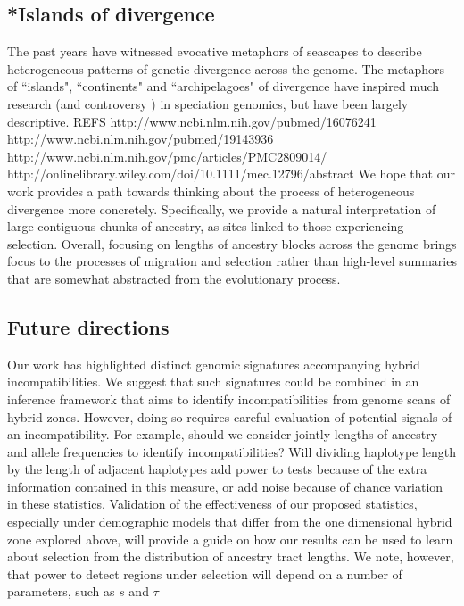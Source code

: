 \documentclass[11pt,letterpaper]{article}
\begin{document}
\subsection{*Islands of divergence}  
The past years have witnessed evocative metaphors of seascapes to describe heterogeneous patterns of genetic divergence across the genome.  
The metaphors of ``islands", ``continents" and ``archipelagoes" of divergence \citep{Turner2005, Nosil2009} have inspired much research (and controversy  \citep{Noor2009,Cruickshank2014}) in speciation genomics, but have been largely descriptive.  
REFS  http://www.ncbi.nlm.nih.gov/pubmed/16076241 http://www.ncbi.nlm.nih.gov/pubmed/19143936 http://www.ncbi.nlm.nih.gov/pmc/articles/PMC2809014/ http://onlinelibrary.wiley.com/doi/10.1111/mec.12796/abstract
We hope that our work provides a path towards thinking about the process of heterogeneous divergence more concretely. %
Specifically, we provide a natural interpretation of large contiguous chunks of ancestry, as sites linked to those experiencing selection.   
Overall, focusing on lengths of ancestry blocks across the genome brings focus to the processes of migration and selection rather than high-level summaries that are somewhat abstracted from the evolutionary process. 


\subsection*{Future directions}
Our work has highlighted distinct genomic signatures accompanying hybrid incompatibilities. 
We suggest that such signatures could be combined in an inference framework that aims to identify incompatibilities from genome scans of hybrid zones.  
However, doing so requires careful evaluation of potential signals of an incompatibility. 
For example, should we consider jointly lengths of ancestry and allele frequencies to identify incompatibilities?
Will dividing haplotype length by the length of adjacent haplotypes add power to tests because of the extra information contained in this measure, or add noise because of chance variation in these statistics.  
Validation of the effectiveness of our proposed statistics, especially under demographic models that differ from the one dimensional hybrid zone explored above, will  provide a guide on how our results can be used to learn about selection from the distribution of ancestry tract lengths. We note, however, that power to detect regions under selection will depend on a number of parameters, such as $s$ and $\tau$
\end{document}
